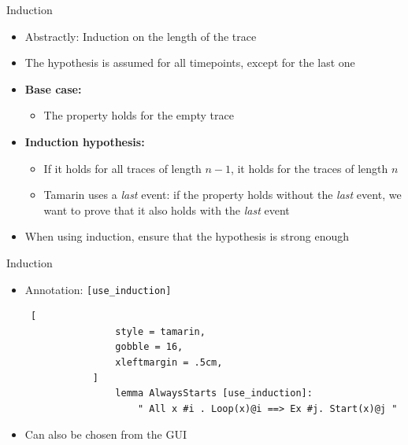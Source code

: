 \documentclass[11pt,aspectratio=169]{beamer}
\begin{document}
\begin{frame}[fragile]{Induction}
    \begin{itemize}
        \item Abstractly: Induction on the length of the trace
        \item The hypothesis is assumed for all timepoints, except for the last 
              one
        \item \textbf{Base case:}
        \begin{itemize}
            \item The property holds for the empty trace
        \end{itemize}
        \item \textbf{Induction hypothesis:}
        \begin{itemize}
            \item If it holds for all traces of length $n - 1$, it holds for 
                  the traces of length $n$
            \item Tamarin uses a \textit{last} event: if the property holds 
                  without the \textit{last} event, we want to prove that it 
                  also holds with the \textit{last} event
        \end{itemize}
        \item When using induction, ensure that the hypothesis is strong enough
    \end{itemize}
\end{frame}

\begin{frame}[fragile,t]{Induction}
    \begin{itemize}
        \item Annotation: \texttt{[use\_induction]}
            \vspace*{.5cm}
            \begin{lstlisting} [
                style = tamarin,
                gobble = 16,
                xleftmargin = .5cm,
            ]
                lemma AlwaysStarts [use_induction]:
                    " All x #i . Loop(x)@i ==> Ex #j. Start(x)@j "
            \end{lstlisting}
        \item Can also be chosen from the GUI
        \end{itemize}
        \vfill
        \begin{figure}
        \end{figure}
\end{frame}
\end{document}
